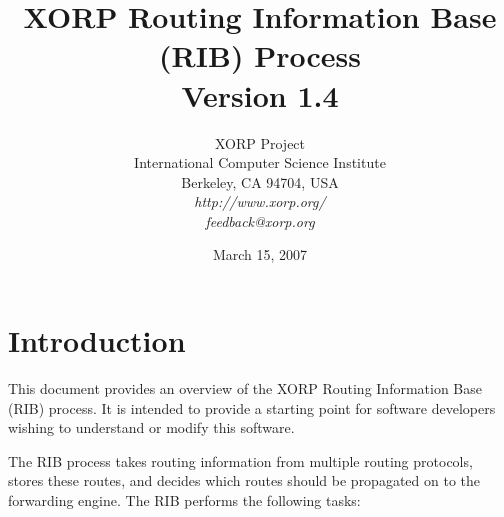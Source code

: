 \documentclass[11pt]{article}
\begin{document}
\title{XORP Routing Information Base (RIB) Process \\
\vspace{1ex}
Version 1.4}
\author{ XORP Project					\\
	 International Computer Science Institute	\\
	 Berkeley, CA 94704, USA			\\
         {\it http://www.xorp.org/}			\\
	 {\it feedback@xorp.org}
}
\date{March 15, 2007}

\maketitle


\section{Introduction}

This document provides an overview of the XORP Routing Information
Base (RIB) process.  It is intended to provide a starting point for
software developers wishing to understand or modify this software.

The RIB process takes routing information from multiple routing
protocols, stores these routes, and decides which routes should be
propagated on to the forwarding engine.  The RIB performs the following
tasks:
\end{document}
